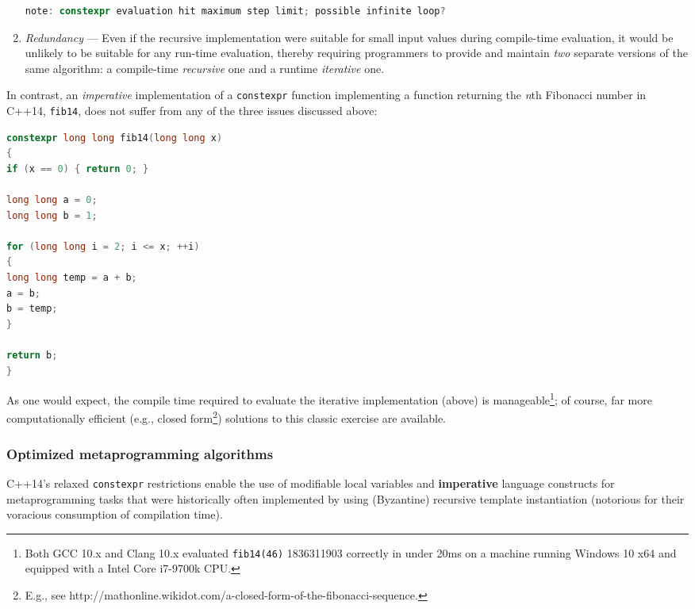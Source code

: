 \begin{enumerate}
{{{\begin{lstlisting}[language=C++, basicstyle={\ttfamily\footnotesize}]
note: constexpr evaluation hit maximum step limit; possible infinite loop?
\end{lstlisting}
}} %
} %
\item{\emph{Redundancy} — Even if the recursive implementation were suitable for small input values during compile-time evaluation, it would be unlikely to be suitable for any run-time evaluation, thereby requiring programmers to provide and maintain \emph{two} separate versions of the same algorithm: a compile-time \emph{recursive} one and a runtime \emph{iterative} one.}
\end{enumerate}

In contrast, an \emph{imperative} implementation of a \texttt{constexpr}
function implementing a function returning the \emph{n\/}th Fibonacci
number in C++14, \texttt{fib14}, does not suffer from any of the three
issues discussed above:

\begin{lstlisting}[language=C++]
constexpr long long fib14(long long x)
{
if (x == 0) { return 0; }

long long a = 0;
long long b = 1;

for (long long i = 2; i <= x; ++i)
{
long long temp = a + b;
a = b;
b = temp;
}

return b;
}
\end{lstlisting}

\noindent As one would expect, the compile time required to evaluate the iterative
implementation (above) is manageable{\cprotect\footnote{Both GCC 10.x
and Clang 10.x evaluated \texttt{fib14(46)} 1836311903 correctly in
under 20ms on a machine running Windows 10 x64 and equipped with a
Intel Core i7-9700k CPU.}}; of course, far more
computationally efficient (e.g., closed form{\cprotect\footnote{E.g.,
see
http://mathonline.wikidot.com/a-closed-form-of-the-fibonacci-sequence.}})
solutions to this classic exercise are available.

\subsubsection[Optimized metaprogramming algorithms]{Optimized metaprogramming algorithms}\label{optimized-metaprogramming-algorithms}

C++14's relaxed \texttt{constexpr} restrictions enable the use of
modifiable local variables and \textbf{imperative} language constructs
for metaprogramming tasks that were historically often implemented by
using (Byzantine) recursive template instantiation (notorious for their
voracious consumption of compilation time).

